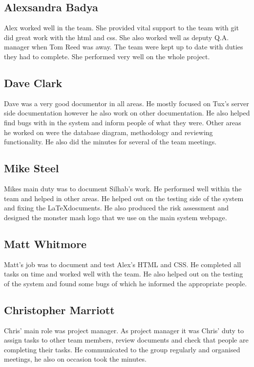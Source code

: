\documentclass{project}
\begin{document}
\subsection{Alexsandra Badya}
Alex worked well in the team. She provided vital support to the team with git did great work with the html and css. She also worked well as deputy Q.A. manager when Tom Reed was away. The team were kept up to date with duties they had to complete. She performed very well on the whole project.

\subsection{Dave Clark}
Dave was a very good documentor in all areas. He mostly focused on Tux's server side documentation however he also work on other documentation. He also helped find bugs with in the system and inform people of what they were. Other areas he worked on were the database diagram, methodology and reviewing functionality. He also did the minutes for several of the team meetings.

\subsection{Mike Steel}
Mikes main duty was to document Silhab's work. He performed well within the team and helped in other areas. He helped out on the testing side of the system and fixing the \LaTeX  documents. He also produced the risk assessment and designed the monster mash logo that we use on the main system webpage.

\subsection{Matt Whitmore}
Matt's job was to document and test Alex's HTML and CSS. He completed all tasks on time and worked well with the team. He also helped out on the testing of the system and found some bugs of which he informed the appropriate people. 

\subsection{Christopher Marriott}
Chris' main role was project manager. As project manager it was Chris' duty to assign tasks to other team members, review documents and check that people are completing their tasks. He communicated to the group regularly and organised meetings, he also on occasion took the minutes.  
\end{document}
